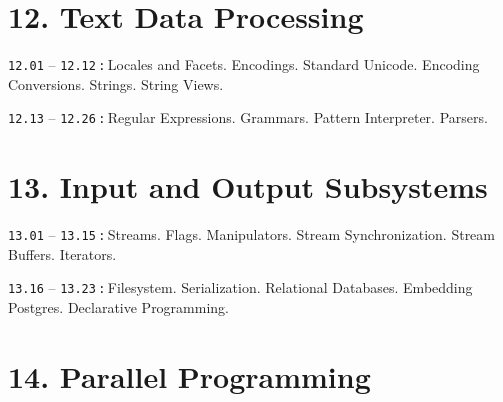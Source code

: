 \documentclass[a4paper,12pt]{article}
\renewenvironment{itemize}
{
    \begin{list}{\labelitemi}
    {
      \setlength{\topsep}{0pt}
      \setlength{\partopsep}{0pt}
      \setlength{\parskip}{0pt}
      \setlength{\itemsep}{0pt}
      \setlength{\parsep}{0pt}
      \setlength{\leftmargin}{14.5pt}
    }
}{\end{list}}
\begin{document}
\section{12. Text Data Processing}

\begin{itemize}

    \item \texttt{12.01} -- \texttt{12.12}\,\texttt{:}\,Locales and Facets. Encodings. Standard Unicode. Encoding Conversions. Strings. String Views.

    \smallskip

    \item \texttt{12.13} -- \texttt{12.26}\,\texttt{:}\,Regular Expressions. Grammars. Pattern Interpreter. Parsers.
    
\end{itemize}

\section{13. Input and Output Subsystems}

\begin{itemize}

    \item \texttt{13.01} -- \texttt{13.15}\,\texttt{:}\,Streams. Flags. Manipulators. Stream Synchronization. Stream Buffers. Iterators.

    \smallskip

    \item \texttt{13.16} -- \texttt{13.23}\,\texttt{:}\,Filesystem. Serialization. Relational Databases. Embedding Postgres. Declarative Programming.
    
\end{itemize}

\section{14. Parallel Programming}
\end{document}
